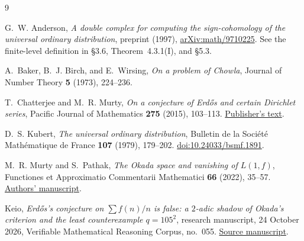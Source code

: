 \documentclass[11pt,a4paper]{article}
\theoremstyle{definition}
\theoremstyle{remark}
\begin{document}
\begin{thebibliography}{9}

G.~W. Anderson,
\emph{A double complex for computing the sign-cohomology of the universal
ordinary distribution}, preprint (1997),
\href{https://arxiv.org/abs/math/9710225}{arXiv:math/9710225}.
See the finite-level definition in \S3.6, Theorem~4.3.1(I), and \S5.3.

A.~Baker, B.~J. Birch, and E.~Wirsing,
\emph{On a problem of Chowla},
Journal of Number Theory \textbf{5} (1973), 224--236.

T.~Chatterjee and M.~R. Murty,
\emph{On a conjecture of Erd\H{o}s and certain Dirichlet series},
Pacific Journal of Mathematics \textbf{275} (2015), 103--113.
\href{https://msp.org/pjm/2015/275-1/pjm-v275-n1-p05-p.pdf}{Publisher's text}.

D.~S. Kubert,
\emph{The universal ordinary distribution},
Bulletin de la Soci\'et\'e Math\'ematique de France
\textbf{107} (1979), 179--202.
\href{https://doi.org/10.24033/bsmf.1891}{doi:10.24033/bsmf.1891}.

M.~R. Murty and S.~Pathak,
\emph{The Okada space and vanishing of $L(1,f)$},
Functiones et Approximatio Commentarii Mathematici
\textbf{66} (2022), 35--57.
\href{https://www.cmi.ac.in/~siddhi/Okada_space_RM_SP_Final.pdf}{Authors' manuscript}.

Keio,
\emph{Erd\H{o}s's conjecture on $\sum f(n)/n$ is false:
a $2$-adic shadow of Okada's criterion and the least counterexample
$q=105^2$}, research manuscript, 24 October 2026,
Verifiable Mathematical Reasoning Corpus, no.~055.
\href{https://github.com/QEEDDD/Verifiable-Mathematical-Reasoning-Corpus/blob/main/\%5B055\%5D\%20ERDOS\%20CONJECTURE.tex}{Source manuscript}.

\end{thebibliography}
\end{document}
